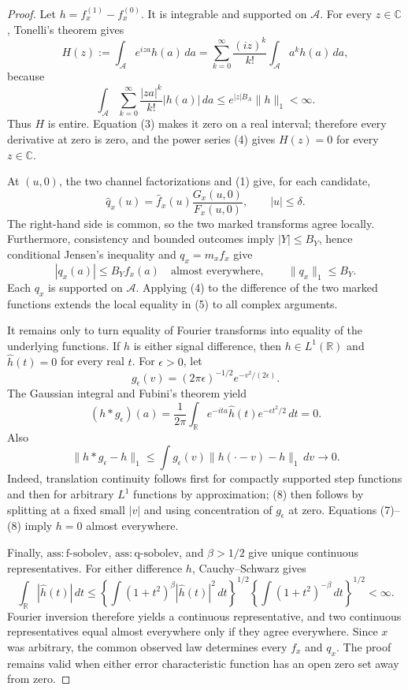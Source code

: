 \documentclass{article}
\begin{document}
\begin{proof}
Let \(h=f_x^{(1)}-f_x^{(0)}\).  It is integrable and supported on
\(\mathcal A\).  For every \(z\in\mathbb C\), Tonelli's theorem gives
\[
 H(z):=\int_{\mathcal A}e^{iza}h(a)\,da
 =\sum_{k=0}^{\infty}\frac{(iz)^k}{k!}
       \int_{\mathcal A}a^kh(a)\,da,                             \tag{4}
\]
because
\[
 \int_{\mathcal A}\sum_{k=0}^{\infty}
 \frac{|za|^k}{k!}|h(a)|\,da
 \le e^{|z|B_A}\|h\|_1<\infty.
\]
Thus \(H\) is entire.  Equation (3) makes it zero on a real interval;
therefore every derivative at zero is zero, and the power series (4) gives
\(H(z)=0\) for every \(z\in\mathbb C\).

At \((u,0)\), the two channel factorizations and (1) give, for each
candidate,
\[
 \widehat q_x(u)=\widehat f_x(u)\frac{G_x(u,0)}{F_x(u,0)},
 \qquad |u|\le\delta.                                            \tag{5}
\]
The right-hand side is common, so the two marked transforms agree locally.
Furthermore, consistency and bounded outcomes imply \(|Y|\le B_Y\), hence
conditional Jensen's inequality and \(q_x=m_xf_x\) give
\[
 |q_x(a)|\le B_Yf_x(a)\quad\text{almost everywhere},
 \qquad \|q_x\|_1\le B_Y.                                       \tag{6}
\]
Each \(q_x\) is supported on \(\mathcal A\).  Applying (4) to the
difference of the two marked functions extends the local equality in (5) to
all complex arguments.

It remains only to turn equality of Fourier transforms into equality of the
underlying functions.  If \(h\) is either signal difference, then
\(h\in L^1(\mathbb R)\) and \(\widehat h(t)=0\) for every real \(t\).  For
\(\epsilon>0\), let
\[
 g_\epsilon(v)=(2\pi\epsilon)^{-1/2}e^{-v^2/(2\epsilon)}.
\]
The Gaussian integral and Fubini's theorem yield
\[
 (h*g_\epsilon)(a)=\frac1{2\pi}\int_{\mathbb R}
 e^{-ita}\widehat h(t)e^{-\epsilon t^2/2}\,dt=0.                \tag{7}
\]
Also
\[
 \|h*g_\epsilon-h\|_1
 \le\int g_\epsilon(v)\|h(\cdot-v)-h\|_1\,dv\longrightarrow0. \tag{8}
\]
Indeed, translation continuity follows first for compactly supported step
functions and then for arbitrary \(L^1\) functions by approximation; (8)
then follows by splitting at a fixed small \(|v|\) and using concentration of
\(g_\epsilon\) at zero.  Equations (7)--(8) imply \(h=0\) almost
everywhere.

Finally, \(\mathrm{ass{:}f\text{-}sobolev}\),
\(\mathrm{ass{:}q\text{-}sobolev}\), and \(\beta>1/2\) give unique
continuous representatives.  For either difference \(h\), Cauchy--Schwarz
gives
\[
 \int_{\mathbb R}|\widehat h(t)|\,dt
 \le
 \left\{\int(1+t^2)^\beta|\widehat h(t)|^2\,dt\right\}^{1/2}
 \left\{\int(1+t^2)^{-\beta}\,dt\right\}^{1/2}<\infty.
\]
Fourier inversion therefore yields a continuous representative, and two
continuous representatives equal almost everywhere only if they agree
everywhere.  Since \(x\) was arbitrary, the common observed law determines
every \(f_x\) and \(q_x\).  The proof remains valid when either error
characteristic function has an open zero set away from zero.
\end{proof}
\end{document}
